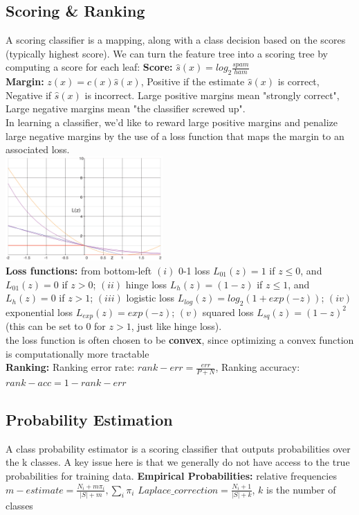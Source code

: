 \documentclass[cheatsheet.tex]{subfiles}
\begin{document}
\subsection{Scoring \& Ranking}
A scoring classifier is a mapping, along with a class decision based on the scores (typically
highest score). We can turn the feature tree into a scoring tree by computing a
score for each leaf: 
\textbf{Score:} $\hat{s}(x)=log_2 \frac{spam}{ham}$\\
\textbf{Margin:} $z(x)=c(x)\hat{s}(x)$, \textbullet Positive if the estimate $\hat{s}(x)$ is correct, Negative if $\hat{s}(x)$ is incorrect. \textbullet Large positive margins mean "strongly correct", Large negative margins mean "the classifier screwed up".
\\
In learning a classifier, we'd like to reward large positive margins and penalize large negative margins by the use of a loss function that maps the margin to an associated loss. \\
\includegraphics[width=60mm]{loss_functions.png}\\
\textbf{Loss functions:} from bottom-left $(i)$ 0-1 loss $L_{01}(z)=1$ if $z\leq 0$, and $L_{01}(z)=0$ if $z > 0$; $(ii)$ hinge loss $L_h(z)=(1 - z)$ if $z \leq 1$, and $L_h(z)=0$ if $z > 1$; $(iii)$ logistic loss $L_{log}(z) = log_2(1 + exp(-z))$; $(iv)$ exponential loss $L_{exp}(z) = exp(-z)$; $(v)$ squared loss $L_{sq}(z) = (1 - z)^2$ (this can be set to $0$ for $z > 1$, just like hinge loss).
\\
the loss function is often chosen to be \textbf{convex}, since optimizing a convex function is computationally more tractable
\\
\textbf{Ranking:} \textbullet Ranking error rate: $rank-err=\frac{err}{P+N}$, Ranking accuracy: $rank-acc=1-rank-err$
\subsection{Probability Estimation}
A class probability estimator is a scoring classifier that outputs probabilities over the k classes. A key issue here is that we generally do not have access to the true probabilities for training data.
\textbf{Empirical Probabilities:} \textbullet relative frequencies \textbullet $m-estimate=\frac{N_i+m\pi_i}{|S|+m}, \sum _{i}{\pi_i} $ \textbullet $Laplace\_correction=\frac{N_i+1}{|S|+k}$, $k$ is the number of classes
\end{document}
